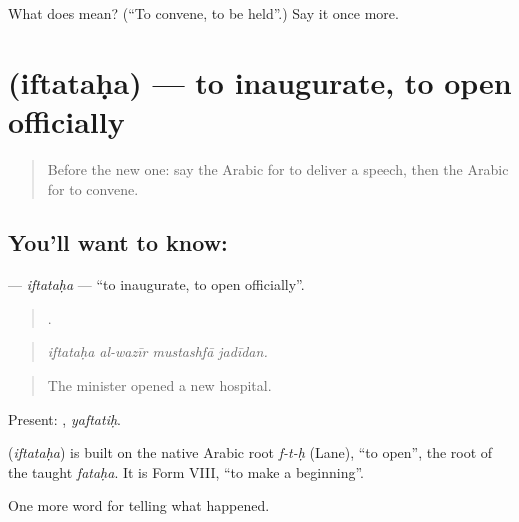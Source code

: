 \begin{tcolorbox}[breakable,colback=teal!4,colframe=teal!35!black,title={Before you move on}]
What does  mean? (\textquotedblleft{}To convene, to be held\textquotedblright{}.) Say it once more.
\end{tcolorbox}
\section[\texorpdfstring{\ar{افتتح} (iftataḥa)}{افتتح (iftataḥa)}]{ (iftataḥa) — to inaugurate, to open officially}

\label{lesson:AR-C357-iftataha}



\begin{quote}
Before the new one: say the Arabic for to deliver a speech, then the Arabic for to convene.
\end{quote}

\subsection*{You'll want to know: }
\textbf{} — \emph{iftataḥa} — \textquotedblleft{}to inaugurate, to open officially\textquotedblright{}.

\begin{quote}
   .
\end{quote}

\begin{quote}
\emph{iftataḥa al-wazīr mustashfā jadīdan.}
\end{quote}

\begin{quote}
The minister opened a new hospital.
\end{quote}

Present: , \emph{yaftatiḥ}.

\begin{cousinweb}
\textbf{} (\emph{iftataḥa}) is built on the native Arabic root \emph{f-t-ḥ} (Lane), \textquotedblleft{}to open\textquotedblright{}, the root of the taught \emph{fataḥa}. It is Form VIII, \textquotedblleft{}to make a beginning\textquotedblright{}.
\end{cousinweb}

\begin{grammarlens}[title={What you've built}]
One more word for telling what happened.
\end{grammarlens}

